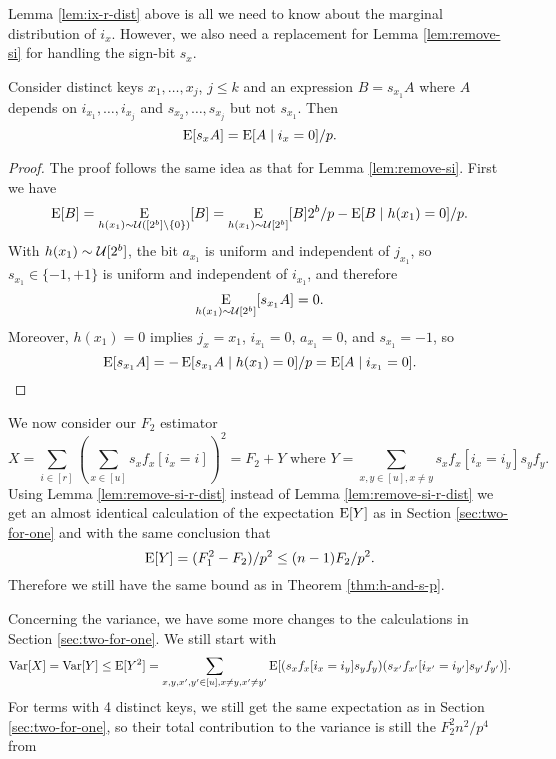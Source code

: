 Lemma \ref{lem:ix-r-dist} above is all we need to know about the
marginal distribution of $i_x$. However, we also need a replacement
for Lemma \ref{lem:remove-si} for handling the sign-bit $s_x$.
\begin{lemma}\label{lem:remove-si-r-dist} Consider distinct keys
   $x_1,\ldots,x_j$, $j\leq k$ and an expression $B=s_{x_1}A$ where $A$
   depends on $i_{x_1},\ldots,i_{x_j}$ and $s_{x_2},\ldots,s_{x_j}$ but not
   $s_{x_1}$. 
   Then
   \begin{equation}\label{eq:remove-si-r-dist}
      \E[s_xA]=\E[A\suchthat i_x=0]/p.
   \end{equation}
\end{lemma}
\begin{proof}
   The proof follows the same idea as that for Lemma \ref{lem:remove-si}.
   First we have
   \[\operatorname*{E}[B]=\operatorname*{E}_{h(x_1) \sim \mathcal{U}([2^b]\setminus\{0\})}[B]=\operatorname*{E}_{h(x_1) \sim \mathcal{U}[2^b]}[B]2^b/p-\operatorname*{E}[B \mid h(x_1)=0]/p.\]
   With $h(x_1)\sim \mathcal{U}[2^b]$, the bit $a_{x_1}$ is uniform and 
   independent of $j_{x_1}$, so $s_{x_1}\in\{-1,+1\}$ is uniform and 
   independent of $i_{x_1}$, and therefore 
   \[\operatorname*{E}_{h(x_1) \sim \mathcal{U}[2^b]}[s_{x_1}A]=0.\]
   Moreover, $h(x_1)=0$ implies $j_x={x_1}$, $i_{x_1}=0$, $a_{x_1}=0$,
   and $s_{x_1}=-1$,
   so 
   \[\operatorname*{E}[s_{x_1}A]=-\operatorname*{E}[s_{x_1}A \mid h(x_1)=0]/p=\operatorname*{E}[A \mid i_{x_1}=0].\]
\end{proof}
We now consider our $F_2$ estimator
\[X=\sum_{i\in[r]}\left( \sum_{x\in[u]}s_x f_x[i_x=i]\right)^2\!
   =F_2+Y\mbox{ where }Y=\sum_{x,y\in[u],x\neq y}
s_x f_x[i_x=i_y]s_y f_y.\]
Using Lemma \ref{lem:remove-si-r-dist} instead of Lemma
\ref{lem:remove-si-r-dist} we get an almost identical calculation 
of the expectation $\operatorname*{E}[Y]$ as
in Section \ref{sec:two-for-one} and with the same
conclusion that 
\begin{equation}\label{eq:E-Mersenne-arb-r}
   \operatorname*{E}[Y]=(F_1^2-F_2)/p^2\leq (n-1)F_2/p^2.
\end{equation}
Therefore we still have the same bound  as in Theorem \ref{thm:h-and-s-p}.

Concerning the variance, we have some more changes to the 
calculations in Section \ref{sec:two-for-one}.
We still start with
\[\operatorname*{Var}[X]=\operatorname*{Var}[Y]\leq \operatorname*{E}[Y^2]=
   \sum_{x,y,x',y'\in[u],x\neq y,x'\neq y'}\operatorname*{E}[(s_x f_x[i_x=i_y]s_y f_y)
(s_{x'}f_{x'}[i_{x'}=i_{y'}]s_{y'} f_{y'})].\] 
For terms with 4 distinct keys, we still get the same expectation
as in Section \ref{sec:two-for-one}, so their
total contribution to the variance is still the $F_2^2 n^2/p^4$ from

